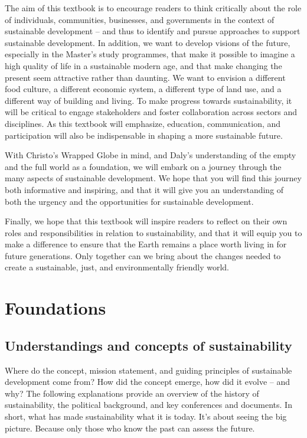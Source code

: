 \documentclass[
  a4paper,
  openany]{book}
\begin{document}
The aim of this textbook is to encourage readers to think critically
about the role of individuals, communities, businesses, and governments
in the context of sustainable development -- and thus to identify and
pursue approaches to support sustainable development. In addition, we
want to develop visions of the future, especially in the Master's study
programmes, that make it possible to imagine a high quality of life in a
sustainable modern age, and that make changing the present seem
attractive rather than daunting. We want to envision a different food
culture, a different economic system, a different type of land use, and
a different way of building and living. To make progress towards
sustainability, it will be critical to engage stakeholders and foster
collaboration across sectors and disciplines. As this textbook will
emphasize, education, communication, and participation will also be
indispensable in shaping a more sustainable future.

With Christo's Wrapped Globe in mind, and Daly's understanding of the
empty and the full world as a foundation, we will embark on a journey
through the many aspects of sustainable development. We hope that you
will find this journey both informative and inspiring, and that it will
give you an understanding of both the urgency and the opportunities for
sustainable development.

Finally, we hope that this textbook will inspire readers to reflect on
their own roles and responsibilities in relation to sustainability, and
that it will equip you to make a difference to ensure that the Earth
remains a place worth living in for future generations. Only together
can we bring about the changes needed to create a sustainable, just, and
environmentally friendly world.

\part{Foundations}

\chapter{Understandings and concepts of
sustainability}\label{understandings-and-concepts-of-sustainability}

Where do the concept, mission statement, and guiding principles of
sustainable development come from? How did the concept emerge, how did
it evolve -- and why? The following explanations provide an overview of
the history of sustainability, the political background, and key
conferences and documents. In short, what has made sustainability what
it is today. It's about seeing the big picture. Because only those who
know the past can assess the future.
\end{document}
